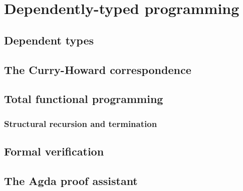 \chapter{Dependently-typed programming}

\section{Dependent types}

\section{The Curry-Howard correspondence}

\section{Total functional programming}

\subsection{Structural recursion and termination}

\section{Formal verification}

\section{The Agda proof assistant}
